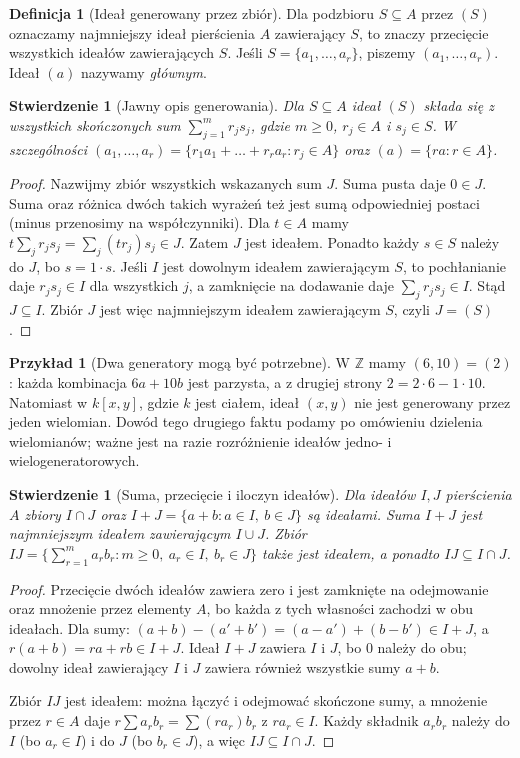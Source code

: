 \documentclass[11pt,a4paper,openany]{report}
\numberwithin{equation}{section}
\theoremstyle{plain}
\newtheorem{stwierdzenie}[twierdzenie]{Stwierdzenie}
\theoremstyle{definition}
\newtheorem{definicja}[twierdzenie]{Definicja}
\newtheorem{przyklad}[twierdzenie]{Przykład}
\theoremstyle{remark}
\newcommand{\Z}{\mathbb Z}
\begin{document}
\begin{definicja}[Ideał generowany przez zbiór]
Dla podzbioru $S\subseteq A$ przez $(S)$ oznaczamy najmniejszy ideał
pierścienia $A$ zawierający $S$, to znaczy przecięcie wszystkich ideałów
zawierających $S$. Jeśli $S=\{a_1,\dots,a_r\}$, piszemy
$(a_1,\dots,a_r)$. Ideał $(a)$ nazywamy \emph{głównym}.
\end{definicja}

\begin{stwierdzenie}[Jawny opis generowania]
Dla $S\subseteq A$ ideał $(S)$ składa się z wszystkich skończonych sum
$\sum_{j=1}^m r_js_j$, gdzie $m\ge0$, $r_j\in A$ i $s_j\in S$.
W szczególności $(a_1,\dots,a_r)=\{r_1a_1+\dots+r_ra_r:r_j\in A\}$
oraz $(a)=\{ra:r\in A\}$.
\end{stwierdzenie}
\begin{proof}
Nazwijmy zbiór wszystkich wskazanych sum $J$.
Suma pusta daje $0\in J$. Suma oraz różnica dwóch takich wyrażeń
też jest sumą odpowiedniej postaci (minus przenosimy na współczynniki).
Dla $t\in A$ mamy $t\sum_jr_js_j=\sum_j(tr_j)s_j\in J$.
Zatem $J$ jest ideałem. Ponadto każdy $s\in S$ należy do $J$,
bo $s=1\cdot s$.
Jeśli $I$ jest dowolnym ideałem zawierającym $S$, to pochłanianie
daje $r_js_j\in I$ dla wszystkich $j$, a zamknięcie na dodawanie
daje $\sum_jr_js_j\in I$. Stąd $J\subseteq I$.
Zbiór $J$ jest więc najmniejszym ideałem zawierającym $S$, czyli $J=(S)$.
\end{proof}

\begin{przyklad}[Dwa generatory mogą być potrzebne]
W $\Z$ mamy $(6,10)=(2)$: każda kombinacja $6a+10b$ jest parzysta,
a z drugiej strony $2=2\cdot6-1\cdot10$.
Natomiast w $k[x,y]$, gdzie $k$ jest ciałem, ideał $(x,y)$
nie jest generowany przez jeden wielomian.
Dowód tego drugiego faktu podamy po omówieniu dzielenia wielomianów;
ważne jest na razie rozróżnienie ideałów jedno- i wielogeneratorowych.
\end{przyklad}

\begin{stwierdzenie}[Suma, przecięcie i iloczyn ideałów]
Dla ideałów $I,J$ pierścienia $A$ zbiory
$I\cap J$ oraz $I+J=\{a+b:a\in I,\ b\in J\}$ są ideałami.
Suma $I+J$ jest najmniejszym ideałem zawierającym $I\cup J$.
Zbiór
$IJ=\{\sum_{r=1}^m a_rb_r:m\ge0,\ a_r\in I,\ b_r\in J\}$
także jest ideałem, a ponadto $IJ\subseteq I\cap J$.
\end{stwierdzenie}
\begin{proof}
Przecięcie dwóch ideałów zawiera zero i jest zamknięte na odejmowanie
oraz mnożenie przez elementy $A$, bo każda z tych własności zachodzi
w obu ideałach. Dla sumy: $(a+b)-(a'+b')=(a-a')+(b-b')\in I+J$,
a $r(a+b)=ra+rb\in I+J$. Ideał $I+J$ zawiera $I$ i $J$,
bo $0$ należy do obu; dowolny ideał zawierający $I$ i $J$ zawiera
również wszystkie sumy $a+b$.

Zbiór $IJ$ jest ideałem: można łączyć i odejmować skończone sumy,
a mnożenie przez $r\in A$ daje
$r\sum a_rb_r=\sum(ra_r)b_r$ z $ra_r\in I$.
Każdy składnik $a_rb_r$ należy do $I$ (bo $a_r\in I$)
i do $J$ (bo $b_r\in J$), a więc $IJ\subseteq I\cap J$.
\end{proof}
\end{document}

